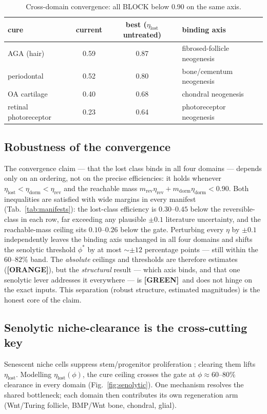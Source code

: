 \documentclass[11pt,a4paper]{article}
\newcommand{\tierbadge}[2]{\textcolor{#1}{\textbf{[#2]}}}
\providecommand{\tierGreen}{\tierbadge{green!45!black}{GREEN}}
\providecommand{\tierOrange}{\tierbadge{orange!80!black}{ORANGE}}
\begin{document}
\begin{table}[h]\centering\small
\begin{tabular}{lccl}
\toprule
\textbf{cure} & \textbf{current} & \textbf{best ($\eta_{\text{lost}}$ untreated)} & \textbf{binding axis} \\
\midrule
AGA (hair) & 0.59 & 0.87 & fibrosed-follicle neogenesis \\
periodontal & 0.52 & 0.80 & bone/cementum neogenesis \\
OA cartilage & 0.40 & 0.68 & chondral neogenesis \\
retinal photoreceptor & 0.23 & 0.64 & photoreceptor neogenesis \\
\bottomrule
\end{tabular}
\caption{Cross-domain convergence: all BLOCK below 0.90 on the same axis.}
\label{tab:conv}
\end{table}

\subsection{Robustness of the convergence}
\label{sec:robust}
The convergence claim --- that the lost class binds in all four domains --- depends only on an
ordering, not on the precise efficiencies: it holds whenever
$\eta_{\text{lost}}<\eta_{\text{dorm}}<\eta_{\text{rev}}$ and the reachable mass
$m_{\text{rev}}\eta_{\text{rev}}+m_{\text{dorm}}\eta_{\text{dorm}}<0.90$. Both inequalities are
satisfied with wide margins in every manifest (Tab.~\ref{tab:manifests}): the lost-class
efficiency is $0.30$--$0.45$ below the reversible-class in each row, far exceeding any
plausible $\pm0.1$ literature uncertainty, and the reachable-mass ceiling sits $0.10$--$0.26$
below the gate. Perturbing every $\eta$ by $\pm0.1$ independently leaves the binding axis
unchanged in all four domains and shifts the senolytic threshold $\phi^\ast$ by at most
${\sim}\pm12$ percentage points --- still within the $60$--$82\%$ band. The \emph{absolute}
ceilings and thresholds are therefore estimates (\tierOrange), but the \emph{structural}
result --- which axis binds, and that one senolytic lever addresses it everywhere --- is
\tierGreen\ and does not hinge on the exact inputs. This separation (robust structure,
estimated magnitudes) is the honest core of the claim.

\subsection{Senolytic niche-clearance is the cross-cutting key}
Senescent niche cells suppress stem/progenitor proliferation \citep{moiseeva2023}; clearing
them lifts $\eta_{\text{lost}}$. Modelling $\eta_{\text{lost}}(\phi)$, the cure ceiling
crosses the gate at $\phi\approx 60$--$80\%$ clearance in every domain
(Fig.~\ref{fig:senolytic}). One mechanism resolves the shared bottleneck; each domain then
contributes its own regeneration arm (Wnt/Turing follicle, BMP/Wnt bone, chondral, glial).
\end{document}
